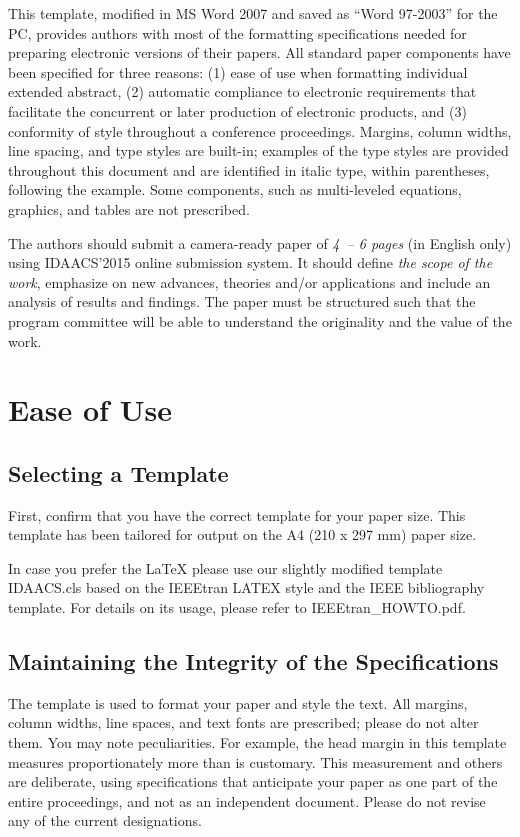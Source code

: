 \documentclass [a4paper,final,conference,10pt]{IDAACS}
\begin{document}
This template, modified in MS Word 2007 and saved as ``Word 97-2003''
for the PC, provides authors with most of the formatting 
specifications needed for preparing electronic versions of their papers. 
All standard paper components have been specified for 
three reasons: (1) ease of use when formatting individual extended abstract, 
(2) automatic compliance to electronic requirements that facilitate the 
concurrent or later production of electronic products, and (3) conformity of 
style throughout a conference proceedings. Margins, column widths, line 
spacing, and type styles are built-in; examples of the type styles are 
provided throughout this document and are identified in italic type, within 
parentheses, following the example. Some components, such as multi-leveled 
equations, graphics, and tables are not prescribed.

The authors should submit a camera-ready paper of \emph{4~-- 6 pages} 
(in English only) using IDAACS'2015 online submission system. It should 
define \emph{the scope of the work}, emphasize on new advances, 
theories and/or applications and include an analysis of results and findings.
The paper must be structured such that the program committee will 
be able to understand the originality and the value of the work.

\section{Ease of Use}

\subsection{Selecting a Template}

First, confirm that you have the correct template for your paper size. This 
template has been tailored for output on the A4 (210 x 297 mm) paper size. 

In case you prefer the \LaTeX{} please use our slightly modified template 
IDAACS.cls based on the IEEEtran LATEX style and the IEEE bibliography 
template. For details on its usage, please refer to IEEEtran\_HOWTO.pdf.

\subsection{Maintaining the Integrity of the Specifications}

The template is used to format your paper and style the text. All margins,
column widths, line spaces, and text fonts are prescribed; please do not 
alter them. You may note peculiarities. For example, the head margin in 
this template measures proportionately more than is customary. This 
measurement and others are deliberate, using specifications that anticipate
your paper as one part of the entire proceedings, and not as an independent
document. Please do not revise any of the current designations.
\end{document}
